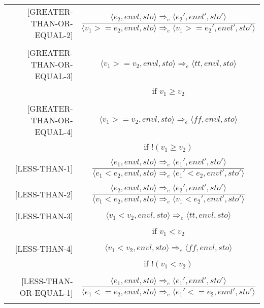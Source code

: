 \begin{longtable}[c] { r c }
  [GREATER-THAN-OR-EQUAL-2] & \( 
    \dfrac { \langle e_2, envl, sto \rangle \Rightarrow_e \langle e_2', envl', sto' \rangle }
      { \langle v_1 > = e_2, envl, sto \rangle \Rightarrow_e \langle v_1 > = e_2', envl', sto' \rangle } \)
  \\
  & \\

  [GREATER-THAN-OR-EQUAL-3] & \( 
    \langle v_1 > = v_2, envl, sto \rangle \Rightarrow_e \langle tt, envl, sto \rangle \)
  \\
  & if \( v_1 \geq v_2 \) \\
  & \\

  [GREATER-THAN-OR-EQUAL-4] & \( 
    \langle v_1 > = v_2, envl, sto \rangle \Rightarrow_e \langle ff, envl, sto \rangle \)
  \\
  & if \( !(v_1 \geq v_2) \) \\
  & \\

  [LESS-THAN-1] & \( 
    \dfrac { \langle e_1, envl, sto \rangle \Rightarrow_e \langle e_1', envl', sto' \rangle }
      { \langle e_1 < e_2, envl, sto \rangle \Rightarrow_e \langle e_1' < e_2, envl', sto' \rangle } \)
  \\
  & \\

  [LESS-THAN-2] & \( 
    \dfrac { \langle e_2, envl, sto \rangle \Rightarrow_e \langle e_2', envl', sto' \rangle }
      { \langle v_1 < e_2, envl, sto \rangle \Rightarrow_e \langle v_1 < e_2', envl', sto' \rangle } \)
  \\
  & \\

  [LESS-THAN-3] & \( 
    \langle v_1 < v_2, envl, sto \rangle \Rightarrow_e \langle tt, envl, sto \rangle \)
  \\
  & if \( v_1 < v_2 \) \\
  & \\

  [LESS-THAN-4] & \( 
    \langle v_1 < v_2, envl, sto \rangle \Rightarrow_e \langle ff, envl, sto \rangle \)
  \\
  & if \( !(v_1 < v_2) \) \\
  & \\

  [LESS-THAN-OR-EQUAL-1] & \( 
    \dfrac { \langle e_1, envl, sto \rangle \Rightarrow_e \langle e_1', envl', sto' \rangle }
      { \langle e_1 < = e_2, envl, sto \rangle \Rightarrow_e \langle e_1' < = e_2, envl', sto' \rangle } \)
  \\
  & \\


\end{longtable}
